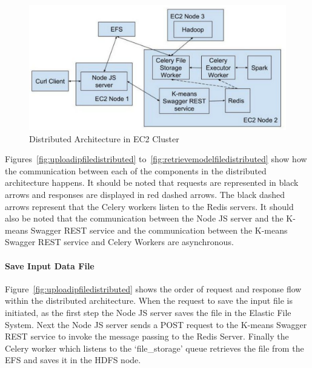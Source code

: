 \begin{figure}[htbp] 
	\centering
	\includegraphics[width=\columnwidth]{images/distributedec2architecture.pdf}
	\caption{Distributed Architecture in EC2 Cluster}
\label{fig:distributedec2architecture} 
\end{figure}

Figures~\ref{fig:uploadipfiledistributed} 
to~\ref{fig:retrievemodelfiledistributed} show how the communication between 
each of the components in the distributed architecture happens. It should be 
noted that requests are represented in black arrows and responses are 
displayed in red dashed arrows. The black dashed arrows represent that the 
Celery workers listen to the Redis servers. It should also be noted that the 
communication between the Node JS server and the K-means Swagger REST 
service and the communication between the K-means Swagger REST service and 
Celery Workers are asynchronous.

\paragraph{Save Input Data File}

Figure~\ref{fig:uploadipfiledistributed} shows the order of request and 
response flow within the distributed architecture. When the request to save 
the input file is initiated, as the first step the Node JS server saves the 
file in the Elastic File System. Next the Node JS server sends a POST request 
to the K-means Swagger REST service to invoke the message passing to the Redis 
Server. Finally the Celery worker which listens to the `file\_storage' queue 
retrieves the file from the EFS and saves it in the HDFS node. 

